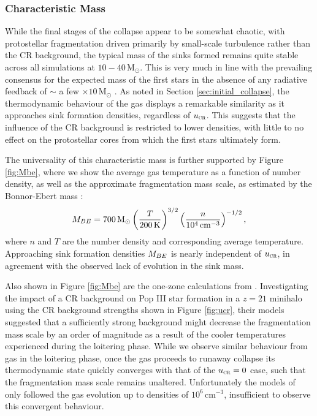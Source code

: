 \documentclass{thesis}
\newcommand{\kelvin}{\ensuremath{\,\mathrm{K}}\xspace}
\newcommand{\cc}{\ensuremath{\,\mathrm{cm}^{-3}}\xspace}
\newcommand{\msun}{\ensuremath{\,\mathrm{M}_{\odot}}\xspace}
\newcommand{\ucr}{\ensuremath{{u}_{\textsc{cr}}}\xspace}
\begin{document}
\subsubsection{Characteristic Mass}

While the final stages of the collapse appear to be somewhat chaotic, with protostellar fragmentation driven primarily by small-scale turbulence rather than the CR background, the typical mass of the sinks formed remains quite stable across all simulations at $10-40\msun$.
This is very much in line with the prevailing consensus for the expected mass of the first stars in the absence of any radiative feedback of $\sim$ a few $\times10\msun$ \citep{Bromm2013}.  
As noted in Section \ref{sec:initial_collapse}, the thermodynamic behaviour of the gas displays a remarkable similarity as it approaches sink formation densities, regardless of $\ucr$.
This suggests that the influence of the CR background is restricted to lower densities, with little to no effect on the protostellar cores from which the first stars ultimately form.

The universality of this characteristic mass is further supported by Figure \ref{fig:Mbe}, where we show the average gas temperature as a function of number density, as well as the approximate fragmentation mass scale, as estimated by the Bonnor-Ebert mass \citep[e.g.,][]{StacyBromm2007}:
\begin{equation}
    M_{\mathrm \small BE} = 700\msun \left(\frac{T}{200\kelvin}\right)^{3/2}
                                 \left(\frac{n}{10^4\cc}   \right)^{-1/2},
\end{equation}
where $n$ and $T$ are the number density and corresponding average temperature.
Approaching sink formation densities $M_{\mathrm \small BE}$ is nearly independent of $\ucr$, in agreement with the observed lack of evolution in the sink mass.

Also shown in Figure \ref{fig:Mbe} are the one-zone calculations from \citet{StacyBromm2007}.
Investigating the impact of a CR background on Pop III star formation in a $z=21$ minihalo using the CR background strengths shown in Figure \ref{fig:ucr}, their models suggested 
that a sufficiently strong background might decrease the fragmentation mass scale by an order of magnitude as a result of the cooler temperatures experienced during the loitering phase.
While we observe similar behaviour from gas in the loitering phase, once the gas proceeds to runaway collapse its thermodynamic state quickly converges with that of the $\ucr=0$ case, such that the fragmentation mass scale remains unaltered.
Unfortunately the models of \citet{StacyBromm2007} only followed the gas evolution up to densities of $10^6\cc$, insufficient to observe this convergent behaviour.
\end{document}
